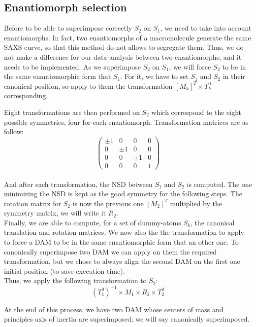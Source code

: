 \documentclass[a4paper, 11pt]{report}
\begin{document}
\subsection{Enantiomorph selection}

Before to be able to superimpose correctly $S_{2}$ on $S_{1}$, we need 
to take into account enantiomorphs. 
In fact, two enantiomorphs of a macromolecule generate the same SAXS 
curve, so that this method do not allows to segregate them. 
Thus, we do not make a difference for our data-analysis between two 
enantiomorphs; and it needs to be implemented. 
As we superimpose $S_{2}$ on $S_{1}$, we will force $S_{2}$ to be in 
the same enantiomorphic form that $S_{1}$. 
For it, we have to set $S_{1}$ and $S_{2}$ in their canonical 
position, so apply to them the transformation 
$[M_{k}]^T \times T_{k}^0$ corresponding.

Eight transformations are then performed on $S_{2}$ which correspond 
to the eight possible symmetries, four for each enantiomorph. 
Transformation matrices are as follow:
\[
\begin{pmatrix}
 \pm 1 & 0 & 0 & 0 \\
 0 & \pm 1 & 0 & 0 \\
 0 & 0 & \pm 1 & 0 \\
 0 & 0 & 0 & 1
\end{pmatrix}
\]\\
And after each transformation, the NSD between $S_{1}$ and $S_{2}$ is 
computed. 
The one minimizing the NSD is kept as the good symmetry for the 
following steps. 
The rotation matrix for $S_{2}$ is now the previous one $[M_{2}]^T$ 
multiplied by the symmetry matrix, we will write it $R_{2}$.\\

Finally, we are able to compute, for a set of dummy-atoms $S_{k}$, the 
canonical translation and rotation matrices. 
We now also the the transformation to apply to force a DAM to be in 
the same enantiomorphic form that an other one. 
To canonically superimpose two DAM we can apply on them the required 
transformation, but we chose to always align the second DAM on the 
first one initial position (to save execution time).\\
Thus, we apply the following transformation to $S_{2}$:
\[(T_{1}^0)^{-1} \times M_{1} \times R_{2} \times T_{2}^0\]

At the end of this process, we have two DAM whose centers of mass and 
principles axis of inertia are superimposed; we will say canonically 
superimposed. 
\end{document}
